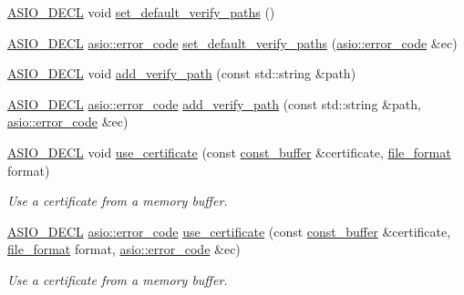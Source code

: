 \begin{DoxyCompactItemize}
\hyperlink{config_8hpp_ab54d01ea04afeb9a8b39cfac467656b7}{A\+S\+I\+O\+\_\+\+D\+E\+C\+L} void \hyperlink{classasio_1_1ssl_1_1context_a95fac53218d445fd65de310f73cd9af4}{set\+\_\+default\+\_\+verify\+\_\+paths} ()
\item 
\hyperlink{config_8hpp_ab54d01ea04afeb9a8b39cfac467656b7}{A\+S\+I\+O\+\_\+\+D\+E\+C\+L} \hyperlink{classasio_1_1error__code}{asio\+::error\+\_\+code} \hyperlink{classasio_1_1ssl_1_1context_abef2f69dc3279cbd342ed3a9ee9d38c2}{set\+\_\+default\+\_\+verify\+\_\+paths} (\hyperlink{classasio_1_1error__code}{asio\+::error\+\_\+code} \&ec)
\item 
\hyperlink{config_8hpp_ab54d01ea04afeb9a8b39cfac467656b7}{A\+S\+I\+O\+\_\+\+D\+E\+C\+L} void \hyperlink{classasio_1_1ssl_1_1context_a2b33f89c218043f1432f1cde28141173}{add\+\_\+verify\+\_\+path} (const std\+::string \&path)
\item 
\hyperlink{config_8hpp_ab54d01ea04afeb9a8b39cfac467656b7}{A\+S\+I\+O\+\_\+\+D\+E\+C\+L} \hyperlink{classasio_1_1error__code}{asio\+::error\+\_\+code} \hyperlink{classasio_1_1ssl_1_1context_a6d3e7542828f2732abd468d1c2494f27}{add\+\_\+verify\+\_\+path} (const std\+::string \&path, \hyperlink{classasio_1_1error__code}{asio\+::error\+\_\+code} \&ec)
\item 
\hyperlink{config_8hpp_ab54d01ea04afeb9a8b39cfac467656b7}{A\+S\+I\+O\+\_\+\+D\+E\+C\+L} void \hyperlink{classasio_1_1ssl_1_1context_a01f00c6595db0123c63030162fdd5ad3}{use\+\_\+certificate} (const \hyperlink{classasio_1_1const__buffer}{const\+\_\+buffer} \&certificate, \hyperlink{classasio_1_1ssl_1_1context__base_acc846aa73fffcab1fecad36dcf2be1fb}{file\+\_\+format} format)
\begin{DoxyCompactList}\small\item\em Use a certificate from a memory buffer. \end{DoxyCompactList}\item 
\hyperlink{config_8hpp_ab54d01ea04afeb9a8b39cfac467656b7}{A\+S\+I\+O\+\_\+\+D\+E\+C\+L} \hyperlink{classasio_1_1error__code}{asio\+::error\+\_\+code} \hyperlink{classasio_1_1ssl_1_1context_a6a0320ec1485aa39a7d1917938084846}{use\+\_\+certificate} (const \hyperlink{classasio_1_1const__buffer}{const\+\_\+buffer} \&certificate, \hyperlink{classasio_1_1ssl_1_1context__base_acc846aa73fffcab1fecad36dcf2be1fb}{file\+\_\+format} format, \hyperlink{classasio_1_1error__code}{asio\+::error\+\_\+code} \&ec)
\begin{DoxyCompactList}\small\item\em Use a certificate from a memory buffer. \end{DoxyCompactList}\item 

\end{DoxyCompactItemize}
